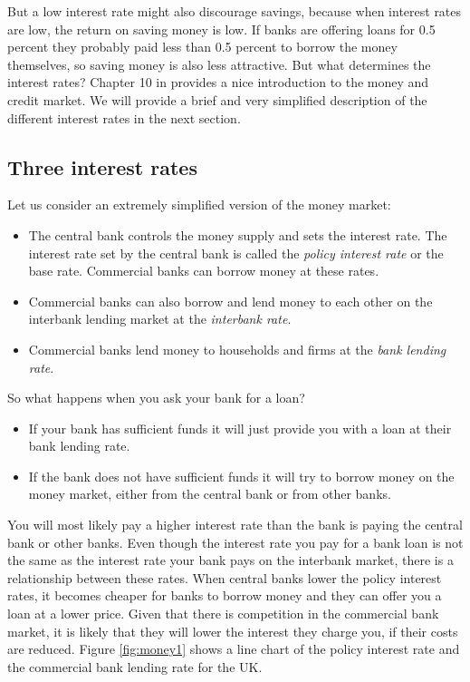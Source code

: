 \documentclass[
]{book}
\providecommand{\tightlist}{%
  \setlength{\itemsep}{0pt}\setlength{\parskip}{0pt}}
\begin{document}
But a low interest rate might also discourage savings, because when interest rates are low, the return on saving money is low. If banks are offering loans for 0.5 percent they probably paid less than 0.5 percent to borrow the money themselves, so saving money is also less attractive. But what determines the interest rates? Chapter 10 in \citep{core} provides a nice introduction to the money and credit market. We will provide a brief and very simplified description of the different interest rates in the next section.

\hypertarget{three-interest-rates}{%
\subsection*{Three interest rates}\label{three-interest-rates}}

Let us consider an extremely simplified version of the money market:

\begin{itemize}
\tightlist
\item
  The central bank controls the money supply and sets the interest rate. The interest rate set by the central bank is called the \emph{policy interest rate} or the base rate. Commercial banks can borrow money at these rates.
\item
  Commercial banks can also borrow and lend money to each other on the interbank lending market at the \emph{interbank rate}.
\item
  Commercial banks lend money to households and firms at the \emph{bank lending rate}.
\end{itemize}

So what happens when you ask your bank for a loan?

\begin{itemize}
\tightlist
\item
  If your bank has sufficient funds it will just provide you with a loan at their bank lending rate.
\item
  If the bank does not have sufficient funds it will try to borrow money on the money market, either from the central bank or from other banks.
\end{itemize}

You will most likely pay a higher interest rate than the bank is paying the central bank or other banks. Even though the interest rate you pay for a bank loan is not the same as the interest rate your bank pays on the interbank market, there is a relationship between these rates. When central banks lower the policy interest rates, it becomes cheaper for banks to borrow money and they can offer you a loan at a lower price. Given that there is competition in the commercial bank market, it is likely that they will lower the interest they charge you, if their costs are reduced. Figure \ref{fig:money1} shows a line chart of the policy interest rate and the commercial bank lending rate for the UK.
\end{document}
